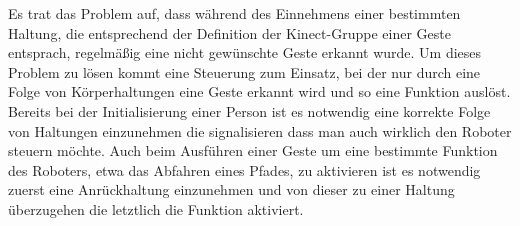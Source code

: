 Es trat das Problem auf, dass während des Einnehmens einer bestimmten Haltung, die entsprechend der Definition 
der Kinect-Gruppe einer Geste entsprach, regelmäßig eine nicht gewünschte Geste erkannt wurde. Um dieses Problem 
zu lösen kommt eine Steuerung zum Einsatz, bei der nur durch eine Folge von Körperhaltungen eine Geste erkannt 
wird und so eine Funktion auslöst. Bereits bei der Initialisierung einer Person ist es notwendig eine korrekte 
Folge von Haltungen einzunehmen die signalisieren dass man auch wirklich den Roboter steuern möchte. Auch beim 
Ausführen einer Geste um eine bestimmte Funktion des Roboters, etwa das Abfahren eines Pfades, zu aktivieren ist 
es notwendig zuerst eine Anrückhaltung einzunehmen und von dieser zu einer Haltung überzugehen die letztlich die 
Funktion aktiviert.




